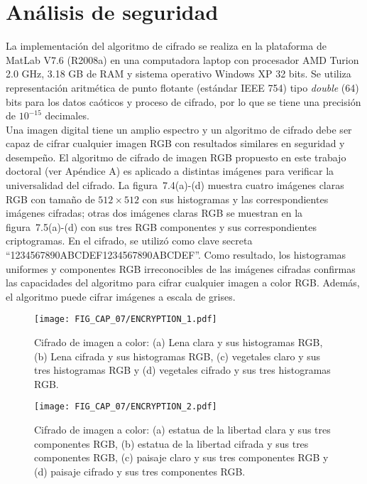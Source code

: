 \section{Análisis de seguridad}
La implementación del algoritmo de cifrado se realiza en la plataforma de MatLab V7.6 (R2008a) en una computadora laptop con procesador AMD Turion 2.0 GHz, 3.18 GB de RAM y sistema operativo Windows XP 32 bits. Se utiliza representación aritmética de punto flotante (estándar IEEE 754) tipo \textit{double} (64) bits para los datos caóticos y proceso de cifrado, por lo que se tiene una precisión de $10^{-15}$ decimales. \\

Una imagen digital tiene un amplio espectro y un algoritmo de cifrado debe ser capaz de cifrar cualquier imagen RGB con resultados similares en seguridad y desempeño. El algoritmo de cifrado de imagen RGB propuesto en este trabajo doctoral (ver Apéndice A) es aplicado a distintas imágenes para verificar la universalidad del cifrado. La figura~7.4(a)-(d) muestra cuatro imágenes claras RGB con tamaño de $512\times 512$ con sus histogramas y las correspondientes imágenes cifradas; otras dos imágenes claras RGB se muestran en la figura~7.5(a)-(d) con sus tres RGB componentes y sus correspondientes criptogramas. En el cifrado, se utilizó como clave secreta ``1234567890ABCDEF1234567890ABCDEF''. Como resultado, los histogramas uniformes y componentes RGB irreconocibles de las imágenes cifradas confirmas las capacidades del algoritmo para cifrar cualquier imagen a color RGB. Además, el algoritmo puede cifrar imágenes a escala de grises. \\

\begin{figure}[!htbp] %
	\center
	\texttt{[image: FIG\_CAP\_07/ENCRYPTION\_1.pdf]}   	 
	\caption{Cifrado de imagen a color: (a) Lena clara y sus histogramas RGB, (b) Lena cifrada y sus histogramas RGB, (c) vegetales claro y sus tres histogramas RGB y (d) vegetales cifrado y sus tres histogramas RGB.}
\end{figure}

\begin{figure}[!htbp] %
	\center
	\texttt{[image: FIG\_CAP\_07/ENCRYPTION\_2.pdf]}  	 
	\caption{Cifrado de imagen a color: (a) estatua de la libertad clara y sus tres componentes RGB, (b) estatua de la libertad cifrada y sus tres componentes RGB, (c) paisaje claro y sus tres componentes RGB y (d) paisaje cifrado y sus tres componentes RGB.}
\end{figure}

